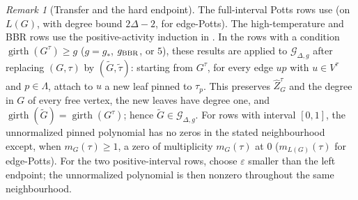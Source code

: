 \documentclass[11pt,reqno]{article}
\theoremstyle{plain}
\theoremstyle{definition}
\theoremstyle{remark}
\newtheorem{remark}[theorem]{Remark}
\theoremstyle{definition}
\theoremstyle{remark}
\newtheorem{remark}[remark]{Remark}
\newcommand{\eps}{\varepsilon}
\newcommand{\Deg}{\Delta}                        %
\newcommand{\Gdegg}[1]{\mathcal{G}_{\Deg,#1}}
\newcommand{\nZpin}[2]{\widehat Z_{#1}^{#2}}
\begin{document}
\begin{remark}[Transfer and the hard endpoint]
\label{rem:additional-potts-transfer}
The full-interval Potts rows use 
(on \(L(G)\), with degree bound \(2\Deg-2\), for edge-Potts).
The high-temperature and BBR rows use the positive-activity induction in
.  In the rows with a condition
\(\operatorname{girth}(G^\tau)\ge g\) (\(g=g_*\), \(g_{\rm BBR}\), or \(5\)),
these results are applied to \(\Gdegg{g}\) after
replacing \((G,\tau)\) by \((\widetilde G,\widetilde\tau)\): starting from
\(G^\tau\), for every edge \(up\) with \(u\in V^\tau\) and
\(p\in\Lambda\), attach to \(u\) a new leaf pinned to \(\tau_p\).  This
preserves \(\nZpin{G}{\tau}\) and the degree in \(G\) of every free vertex,
the new leaves have degree one, and
\(\operatorname{girth}(\widetilde G)=\operatorname{girth}(G^\tau)\); hence
\(\widetilde G\in\Gdegg{g}\).  For rows with interval \([0,1]\), the
unnormalized pinned polynomial has no zeros in the stated neighbourhood
except, when \(m_G(\tau)\ge1\), a zero of multiplicity \(m_G(\tau)\) at
\(0\) (\(m_{L(G)}(\tau)\) for edge-Potts).
For the two positive-interval rows, choose \(\eps\) smaller than the
left endpoint; the unnormalized polynomial is then nonzero throughout
the same neighbourhood.
\end{remark}



\end{document}
